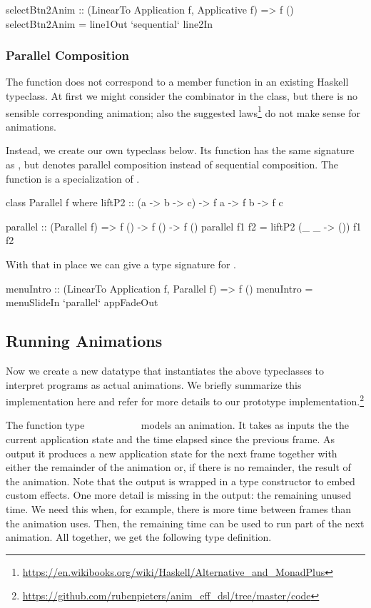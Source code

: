 \begin{code}
selectBtn2Anim :: (LinearTo Application f, Applicative f) => f ()
selectBtn2Anim = line1Out `sequential` line2In
\end{code}

\subsubsection{Parallel Composition}

The  function does not correspond to a member function in an
existing Haskell typeclass. At first we might consider the \hs{<|>} combinator
in the  class, but there is no sensible corresponding
 animation; also the suggested 
laws\footnote{\url{https://en.wikibooks.org/wiki/Haskell/Alternative_and_MonadPlus}}
do not make sense for animations.

Instead, we create our own  typeclass below. Its function
 has the same signature as , but denotes
parallel composition instead of sequential composition. The
 function is a specialization of .

\begin{code}
class Parallel f where
  liftP2 :: (a -> b -> c) -> f a -> f b -> f c

parallel :: (Parallel f) => f () -> f () -> f ()
parallel f1 f2 = liftP2 (\_ _ -> ()) f1 f2
\end{code}
With that in place we can give a type signature for .
\begin{code}
menuIntro :: (LinearTo Application f, Parallel f) => f ()
menuIntro = menuSlideIn `parallel` appFadeOut
\end{code}

\subsection{Running Animations}

Now we create a new  datatype that instantiates the above
typeclasses to interpret \dsl{} programs as actual animations. We briefly
summarize this implementation here and refer for more details to
our prototype
implementation.\footnote{\url{https://github.com/rubenpieters/anim_eff_dsl/tree/master/code}}

The function type
~\hs{->}~~\hs{->}~~\hs{(}~~~~~
models an animation.
It takes as inputs the the current application state and the
time elapsed since the previous frame. As output it produces a new
application state for the next frame together with either the remainder of the animation or, if there is no remainder, the result of
the animation. Note that the output is wrapped in a type
constructor  to embed custom effects. 
One more detail is missing in the output: the remaining unused time. We need
this when, for example, there is more time between frames than the animation
uses.
Then, the remaining time
can be used to run part of the next animation. All together, we get
the following type definition.

